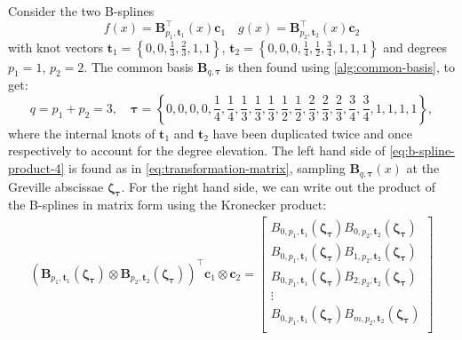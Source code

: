 \begin{indentedexample}
    \label{ex:linear-spline-multiplication}
    Consider the two B-splines
    \begin{equation*}
        f(x) = \mathbf{B}_{p_1, \mathbf t_1}^\top(x) \mathbf{c}_1
        \quad g(x) = \mathbf{B}_{p_2, \mathbf t_2}^\top(x) \mathbf{c}_2
    \end{equation*}
    with knot vectors $\mathbf t_1 = \left\{0, 0, \frac{1}{3}, \frac{2}{3}, 1, 1\right\}$,  $\mathbf t_2 = \left\{0, 0, 0, \frac{1}{4}, \frac{1}{2}, \frac{3}{4}, 1, 1, 1\right\}$ and degrees  $p_1 = 1$, $p_2 = 2$. 
    The common basis $\mathbf{B}_{q,\boldsymbol{\tau}}$ is then found using \cref{alg:common-basis}, to get:
    \begin{equation*}
        q = p_1 + p_2 = 3,
        \quad
        \boldsymbol{\tau} = \left\{0, 0, 0, 0, \frac{1}{4}, \frac{1}{4}, \frac{1}{3}, \frac{1}{3}, \frac{1}{3}, \frac{1}{2}, \frac{1}{2}, \frac{2}{3}, \frac{2}{3}, \frac{2}{3}, \frac{3}{4}, \frac{3}{4}, 1, 1, 1, 1\right\},
    \end{equation*}
    where the internal knots of $\mathbf t_1$ and $\mathbf t_2$ have been duplicated twice and once respectively to account for the degree elevation. 
    The left hand side of \cref{eq:b-spline-product-4} is found as in \cref{eq:transformation-matrix}, sampling $\mathbf B_{q, \boldsymbol{\tau}}(x)$ at the Greville abscissae $\boldsymbol{\zeta_\tau}$.
    For the right hand side, we can write out the product of the B-splines in matrix form using the Kronecker product:
    \begin{equation*}
        \begin{aligned}
            (\mathbf B_{p_1, \mathbf{t}_1}(\boldsymbol{\zeta_\tau}) \otimes \mathbf B_{p_2, \mathbf{t}_2}(\boldsymbol{\zeta_\tau}))^\top \mathbf{c}_1 \otimes \mathbf{c}_2 = \begin{bmatrix}
                B_{0, p_1, \mathbf{t}_1}(\boldsymbol{\zeta_\tau}) B_{0, p_2, \mathbf{t}_2}(\boldsymbol{\zeta_\tau}) \\
                B_{0, p_1, \mathbf{t}_1}(\boldsymbol{\zeta_\tau}) B_{1, p_2, \mathbf{t}_2}(\boldsymbol{\zeta_\tau}) \\
                B_{0, p_1, \mathbf{t}_1}(\boldsymbol{\zeta_\tau}) B_{2, p_2, \mathbf{t}_2}(\boldsymbol{\zeta_\tau}) \\
                \vdots \\
                B_{0, p_1, \mathbf{t}_1}(\boldsymbol{\zeta_\tau}) B_{m, p_2, \mathbf{t}_2}(\boldsymbol{\zeta_\tau}) \\

\end{bmatrix}
\end{aligned}
\end{equation*}
\end{indentedexample}
